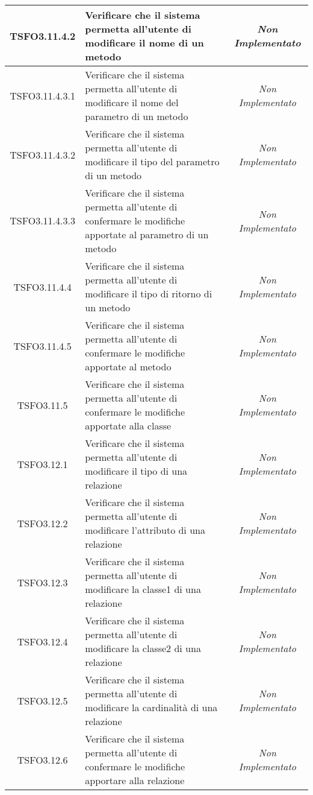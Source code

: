 \begin{longtable}{|c|>{}m{8cm}|c|}
\hypertarget{TSFO3.11.4.2}{TSFO3.11.4.2} & Verificare che il sistema permetta all'utente di modificare il nome di un metodo & \textit{Non Implementato}\\ \hline
\hypertarget{TSFO3.11.4.3.1}{TSFO3.11.4.3.1} & Verificare che il sistema permetta all'utente di modificare il nome del parametro di un metodo & \textit{Non Implementato}\\ \hline
\hypertarget{TSFO3.11.4.3.2}{TSFO3.11.4.3.2} & Verificare che il sistema permetta all'utente di modificare il tipo del parametro di un metodo & \textit{Non Implementato}\\ \hline
\hypertarget{TSFO3.11.4.3.3}{TSFO3.11.4.3.3} & Verificare che il sistema permetta all'utente di confermare le modifiche apportate al parametro di un metodo & \textit{Non Implementato}\\ \hline
\hypertarget{TSFO3.11.4.4}{TSFO3.11.4.4} & Verificare che il sistema permetta all'utente di modificare il tipo di ritorno di un metodo & \textit{Non Implementato}\\ \hline
\hypertarget{TSFO3.11.4.5}{TSFO3.11.4.5} & Verificare che il sistema permetta all'utente di confermare le modifiche apportate al metodo & \textit{Non Implementato}\\ \hline
\hypertarget{TSFO3.11.5}{TSFO3.11.5} & Verificare che il sistema permetta all'utente di confermare le modifiche apportate alla classe & \textit{Non Implementato}\\ \hline
\hypertarget{TSFO3.12.1}{TSFO3.12.1} & Verificare che il sistema permetta all'utente di modificare il tipo di una relazione & \textit{Non Implementato}\\ \hline
\hypertarget{TSFO3.12.2}{TSFO3.12.2} & Verificare che il sistema permetta all'utente di modificare l'attributo di una relazione & \textit{Non Implementato}\\ \hline
\hypertarget{TSFO3.12.3}{TSFO3.12.3} & Verificare che il sistema permetta all'utente di modificare la classe1 di una relazione & \textit{Non Implementato}\\ \hline
\hypertarget{TSFO3.12.4}{TSFO3.12.4} & Verificare che il sistema permetta all'utente di modificare la classe2 di una relazione & \textit{Non Implementato}\\ \hline
\hypertarget{TSFO3.12.5}{TSFO3.12.5} & Verificare che il sistema permetta all'utente di modificare la cardinalità di una relazione & \textit{Non Implementato}\\ \hline
\hypertarget{TSFO3.12.6}{TSFO3.12.6} & Verificare che il sistema permetta all'utente di confermare le modifiche apportare alla relazione & \textit{Non Implementato}\\ \hline

\end{longtable}
